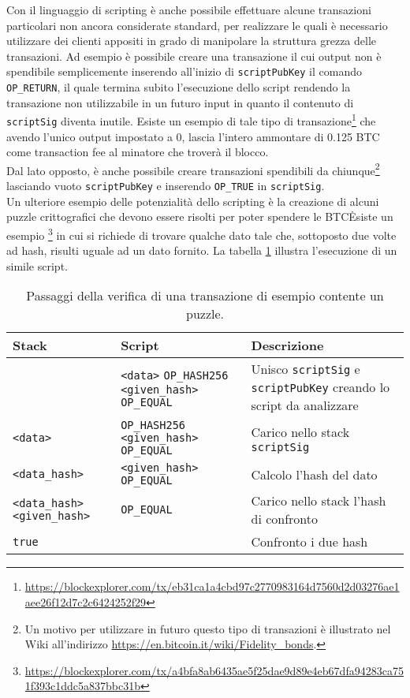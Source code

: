 Con il linguaggio di scripting è anche possibile effettuare alcune transazioni particolari non ancora considerate standard, per realizzare le quali è necessario utilizzare dei clienti appositi in grado di manipolare la struttura grezza delle transazioni. Ad esempio è possibile creare una transazione il cui output non è spendibile semplicemente inserendo all'inizio di \verb|scriptPubKey| il comando \verb|OP_RETURN|, il quale termina subito l'esecuzione dello script rendendo la transazione non utilizzabile in un futuro input in quanto il contenuto di \verb|scriptSig| diventa inutile. Esiste un esempio di tale tipo di transazione\footnote{\url{https://blockexplorer.com/tx/eb31ca1a4cbd97c2770983164d7560d2d03276ae1aee26f12d7c2c6424252f29}} che avendo l'unico output impostato a 0, lascia l'intero ammontare di 0.125 BTC come transaction fee al minatore che troverà il blocco.\\
Dal lato opposto, è anche possibile creare transazioni spendibili da chiunque\footnote{Un motivo per utilizzare in futuro questo tipo di transazioni è illustrato nel Wiki all'indirizzo \url{https://en.bitcoin.it/wiki/Fidelity_bonds}.} lasciando vuoto \verb|scriptPubKey| e inserendo \verb|OP_TRUE| in \verb|scriptSig|.\\
Un ulteriore esempio delle potenzialità dello scripting è la creazione di alcuni puzzle crittografici che devono essere risolti per poter spendere le BTC\. Esiste un esempio \footnote{\url{https://blockexplorer.com/tx/a4bfa8ab6435ae5f25dae9d89e4eb67dfa94283ca751f393c1ddc5a837bbc31b}} in cui si richiede di trovare qualche dato tale che, sottoposto due volte ad hash, risulti uguale ad un dato fornito. La tabella \ref{table:puzzle-transaction} illustra l'esecuzione di un simile script.

\begin{table}
  \centering
  \label{table:puzzle-transaction}
  \begin{tabular}{m{} | m{} | m{}}
    \hline
    Stack&Script&Descrizione \\
    \hline
    \verb||&\verb|<data>| \verb|OP_HASH256| \verb|<given_hash>| \verb|OP_EQUAL|&Unisco \verb|scriptSig| e \verb|scriptPubKey| creando lo script da analizzare  \\ \hline
    \verb|<data>|&\verb|OP_HASH256| \verb|<given_hash>| \verb|OP_EQUAL|&Carico nello stack \verb|scriptSig| \\ \hline
    \verb|<data_hash>|&\verb|<given_hash>| \verb|OP_EQUAL|&Calcolo l'hash del dato \\ \hline
    \verb|<data_hash>| \verb|<given_hash>|&\verb|OP_EQUAL|&Carico nello stack l'hash di confronto \\ \hline
    \verb|true|&\verb||&Confronto i due hash \\ \hline
  \end{tabular}
  \caption{Passaggi della verifica di una transazione di esempio contente un puzzle.}
\end{table}

